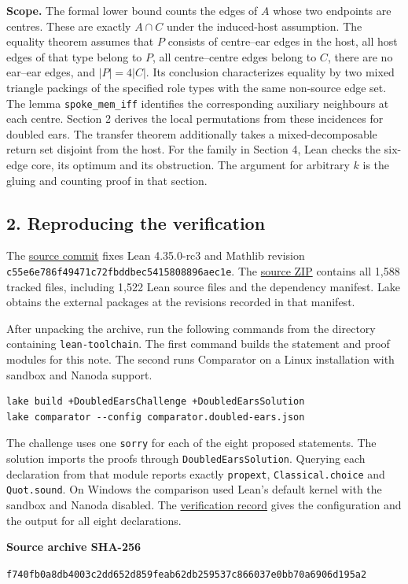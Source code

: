 \documentclass[english,11pt,a4paper]{article}
\begin{document}
\textbf{Scope.} The formal lower bound counts the edges of \(A\) whose two endpoints are centres. These are exactly \(A\cap C\) under the induced-host assumption. The equality theorem assumes that \(P\) consists of centre--ear edges in the host, all host edges of that type belong to \(P\), all centre--centre edges belong to \(C\), there are no ear--ear edges, and \(|P|=4|C|\). Its conclusion characterizes equality by two mixed triangle packings of the specified role types with the same non-source edge set. The lemma \texttt{spoke\_mem\_iff} identifies the corresponding auxiliary neighbours at each centre. Section 2 derives the local permutations from these incidences for doubled ears. The transfer theorem additionally takes a mixed-decomposable return set disjoint from the host. For the family in Section 4, Lean checks the six-edge core, its optimum and its obstruction. The argument for arbitrary \(k\) is the gluing and counting proof in that section.

\clearpage\subsection{2. Reproducing the verification}\label{reproducing-the-verification}

The \href{https://github.com/jtraverso/typed-triangle-absorption/tree/c7bae66dfd66370138d2f1a6ecc51d3aa29ea8e4}{source commit} fixes Lean 4.35.0-rc3 and Mathlib revision \nolinkurl{c55e6e786f49471c72fbddbec5415808896aec1e}. The \href{https://github.com/jtraverso/nash-williams-triangle-decompositions-release/releases/download/doubled-ears-preprint-1.0-r3/Doubled_ears_LEAN_SOURCE_v1.0.zip}{source ZIP} contains all 1,588 tracked files, including 1,522 Lean source files and the dependency manifest. Lake obtains the external packages at the revisions recorded in that manifest.

After unpacking the archive, run the following commands from the directory containing \texttt{lean-toolchain}. The first command builds the statement and proof modules for this note. The second runs Comparator on a Linux installation with sandbox and Nanoda support.

\begin{verbatim}
lake build +DoubledEarsChallenge +DoubledEarsSolution
lake comparator --config comparator.doubled-ears.json
\end{verbatim}

The challenge uses one \texttt{sorry} for each of the eight proposed statements. The solution imports the proofs through \texttt{DoubledEarsSolution}. Querying each declaration from that module reports exactly \texttt{propext}, \texttt{Classical.choice} and \texttt{Quot.sound}. On Windows the comparison used Lean's default kernel with the sandbox and Nanoda disabled. The \href{https://github.com/jtraverso/nash-williams-triangle-decompositions-release/tree/doubled-ears-preprint-1.0-r3/series_notes/DOUBLED_EAR_ABSORBERS/preprint-1.0/formalization}{verification record} gives the configuration and the output for all eight declarations.

\textbf{Source archive SHA-256}

\nolinkurl{f740fb0a8db4003c2dd652d859feab62db259537c866037e0bb70a6906d195a2}
\end{document}

